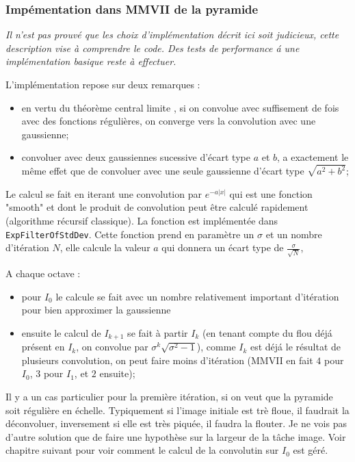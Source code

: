 \subsubsection{Imp\'ementation dans MMVII de la pyramide}

\emph{Il n'est pas prouv\'e que les choix d'impl\'ementation d\'ecrit ici soit judicieux, cette description
vise \`a comprendre le code. Des tests de performance \'a une impl\'ementation basique reste \`a effectuer.}

L'impl\'ementation repose sur deux remarques :

\begin{itemize}
    \item en vertu du th\'eor\`eme central limite , si on convolue avec suffisement de fois avec des fonctions r\'eguli\`eres,
          on converge vers la convolution avec une gaussienne;
    \item convoluer avec deux gaussiennes sucessive d'\'ecart type $a$ et $b$, a exactement le même effet que
          de convoluer avec une seule gaussienne d'\'ecart type $\sqrt{a^2+b^2}$;
  
\end{itemize}

Le calcul se fait en iterant une convolution par $e^{-a|x|}$ qui est une fonction 
"smooth" et dont le produit de convolution peut \^etre calcul\'e rapidement (algorithme r\'ecursif classique).
La fonction est impl\'ement\'ee dans {\tt ExpFilterOfStdDev}.  Cette fonction prend
en param\`etre un $\sigma$ et un nombre d'it\'eration $N$, elle calcule la valeur
$a$ qui donnera un \'ecart type de $\frac{\sigma}{\sqrt{N}}$,

A chaque octave  :

\begin{itemize}
   \item  pour $I_0$ le calcule se fait avec un nombre relativement important d'it\'eration pour
          bien approximer la gaussienne

   \item  ensuite le calcul de $I_{k+1}$ se fait \`a partir $I_k$ (en tenant compte du flou d\'ej\'a pr\'esent
          en $I_k$, on convolue par $\sigma^k \sqrt{\sigma^2-1}$), comme $I_k$ est d\'ej\'a le r\'esultat de plusieurs
          convolution, on peut faire moins d'it\'eration (MMVII en fait $4$ pour $I_0$, $3$ pour $I_1$, et $2$ ensuite);
\end{itemize}

Il y a un cas particulier pour la premi\`ere it\'eration, si on veut que la pyramide soit r\'eguli\`ere en \'echelle.
Typiquement si l'image initiale est tr\`e floue, il faudrait la d\'econvoluer, inversement si elle est tr\`es piqu\'ee,
il faudra la flouter.  Je ne vois pas d'autre solution que de faire une hypoth\`ese sur la largeur de la t\^ache image.
Voir chapitre suivant pour voir comment le calcul de la convolutin sur $I_0$ est g\'er\'e.

